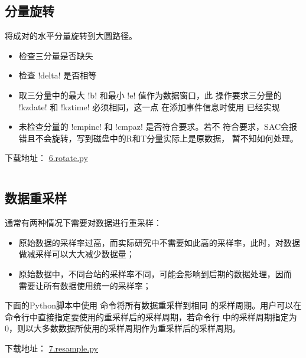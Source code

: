 \subsection{分量旋转}
\label{subsec:rotate-python}
将成对的水平分量旋转到大圆路径。
\begin{itemize}
\item 检查三分量是否缺失
\item 检查 !delta! 是否相等
\item 取三分量中的最大 !b! 和最小 !e! 值作为数据窗口，此
    操作要求三分量的 !kzdate! 和 !kztime! 必须相同，这一点
    在添加事件信息时使用  已经实现
\item 未检查分量的 !cmpinc! 和 !cmpaz! 是否符合要求。若不
    符合要求，SAC会报错且不会旋转，写到磁盘中的R和T分量实际上是原数据，
    暂不知如何处理。
\end{itemize}

下载地址： \href{https://raw.githubusercontent.com/seisman/SAC_Docs_zh/master/call-in-script/6.rotate.py}{6.rotate.py}
\inputminted{python}{./call-in-script/6.rotate.py}

\subsection{数据重采样}
\label{subsec:resample-python}
通常有两种情况下需要对数据进行重采样：
\begin{itemize}
\item 原始数据的采样率过高，而实际研究中不需要如此高的采样率，此时，对数据
    做减采样可以大大减少数据量；
\item 原始数据中，不同台站的采样率不同，可能会影响到后期的数据处理，因而
    需要让所有数据使用统一的采样率；
\end{itemize}
下面的Python脚本中使用  命令将所有数据重采样到相同
的采样周期。用户可以在命令行中直接指定要使用的重采样后的采样周期，若命令行
中的采样周期指定为0，则以大多数数据所使用的采样周期作为重采样后的采样周期。

下载地址： \href{https://raw.githubusercontent.com/seisman/SAC_Docs_zh/master/call-in-script/7.resample.py}{7.resample.py}
\inputminted{python}{./call-in-script/7.resample.py}
